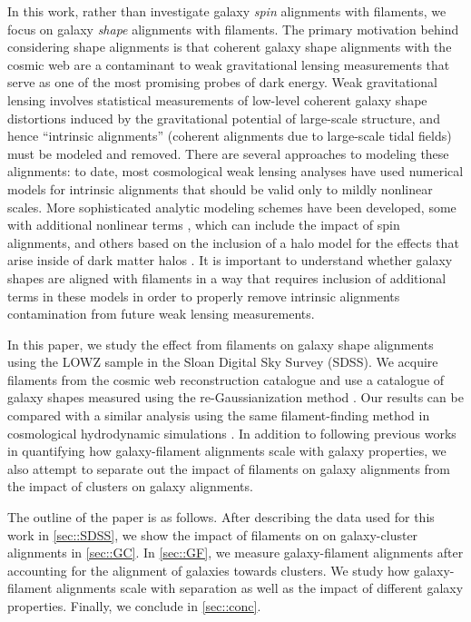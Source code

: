 \documentclass[usenatbib,useAMS]{mnras}
\theoremstyle{remark}
\begin{document}
In this work, rather than investigate galaxy {\em spin} alignments with filaments, we focus on
galaxy {\em shape} alignments with filaments.  The primary motivation behind considering shape alignments
is that coherent galaxy shape alignments with the cosmic web are a contaminant to weak gravitational
lensing measurements \citep[for recent reviews, see][]{2015RPPh...78h6901K,2017arXiv171003235M} that
serve as one of the most promising probes of dark energy.  Weak gravitational lensing involves
statistical measurements of low-level coherent galaxy shape distortions induced by the gravitational
potential of large-scale structure, and hence ``intrinsic alignments'' (coherent alignments due to
large-scale tidal fields) must be modeled and removed. There are several approaches to modeling
these alignments: to date, most cosmological weak lensing analyses
\citep[e.g.,][]{2017arXiv170801530D,2017MNRAS.465.1454H} have used numerical models for intrinsic
alignments that should be valid only to mildly nonlinear scales.  More sophisticated analytic
modeling schemes have been developed, some with additional nonlinear terms
\citep[e.g.,][]{2017arXiv170809247B}, which can include the impact of spin alignments, and others based on the inclusion of a halo model for the
effects that arise inside of dark matter halos \citep{2010MNRAS.402.2127S}.  It is important to
understand whether galaxy shapes are aligned with filaments in a way that requires inclusion of
additional terms in these models in order to properly remove intrinsic alignments contamination from
future weak lensing measurements.

In this paper, we study the effect from filaments on galaxy shape alignments using the LOWZ sample in the Sloan Digital Sky Survey (SDSS).
We acquire filaments from the cosmic web reconstruction catalogue \citep{2016MNRAS.461.3896C} and
use a catalogue of galaxy shapes measured using the
re-Gaussianization method \citep{Hirata2003}. 
Our results can be compared with a similar analysis using the same filament-finding method
in cosmological hydrodynamic simulations \citep{2015MNRAS.454.3341C}.  In addition to following
previous works in quantifying how galaxy-filament alignments scale with galaxy properties, we also
attempt to separate out the impact of filaments on galaxy alignments from the impact of clusters on
galaxy alignments.

The outline of the paper is as follows.  After describing the data used for this work in
\autoref{sec::SDSS}, we show the impact of filaments on 
on galaxy-cluster alignments in \autoref{sec::GC}. 
In \autoref{sec::GF}, we measure galaxy-filament alignments
after accounting for the alignment of galaxies towards clusters.
We study how galaxy-filament alignments scale with separation as well as the impact of different galaxy properties. 
Finally, we conclude in \autoref{sec::conc}.
\end{document}
